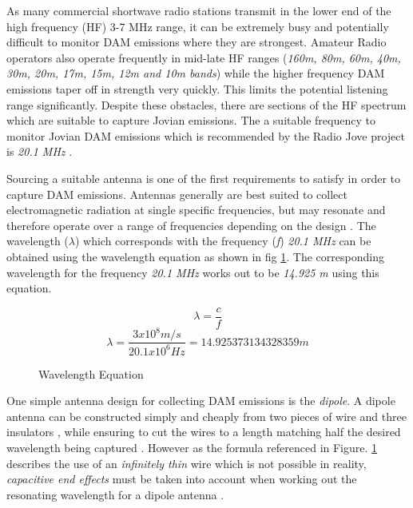 \documentclass[runningheads,a4paper]{llncs}
\begin{document}
As many commercial shortwave radio stations transmit in the lower end of the high frequency (\gls{HF}) 3-7 MHz range, it can be extremely busy and potentially difficult to monitor \gls{DAM} emissions where they are strongest. Amateur Radio operators also operate frequently in mid-late \gls{HF} ranges (\textit{160m, 80m, 60m, 40m, 30m, 20m, 17m, 15m, 12m and 10m bands}) while the higher frequency \gls{DAM} emissions taper off in strength very quickly. This limits the potential listening range significantly. Despite these obstacles, there are sections of the \gls{HF} spectrum which are suitable to capture Jovian emissions. The a suitable frequency to monitor Jovian \gls{DAM} emissions which is recommended by the Radio Jove project is \textit{20.1 MHz} \citep{nasa12}. 

Sourcing a suitable antenna is one of the first requirements to satisfy in order to capture \gls{DAM} emissions. Antennas generally are best suited to collect electromagnetic radiation at single specific frequencies, but may resonate and therefore operate over a range of frequencies depending on the design \citep{nasa12}. The wavelength ($\lambda$) which corresponds with the frequency (\textit{f}) \textit{20.1 MHz} can be obtained using the wavelength equation as shown in fig \ref{fig:wavelength_equation}. The corresponding wavelength for the frequency \textit{20.1 MHz} works out to be \textit{14.925 m} using this equation.

%
\begin{figure}[here]
  \centering
  \begin{equation}  	
    \lambda = \frac{c}{f}
  \end{equation}
  \begin{equation}
    \lambda = \frac{3x10^8 m/s}{20.1x10^6 Hz} = 14.925373134328359 m
  \end{equation}
  \caption{Wavelength Equation}
  \label{fig:wavelength_equation}
\end{figure}
%

One simple antenna design for collecting \gls{DAM} emissions is the \textit{dipole}. A dipole antenna can be constructed simply and cheaply from two pieces of wire and three insulators \citep{nasa12}, while ensuring to cut the wires to a length matching half the desired wavelength being captured \citep{nasa12}. However as the formula referenced in Figure. \ref{fig:wavelength_equation} describes the use of an \textit{infinitely thin} wire which is not possible in reality, \textit{capacitive end effects} must be taken into account when working out the resonating wavelength for a dipole antenna \citep{nasa12}.
\end{document}
